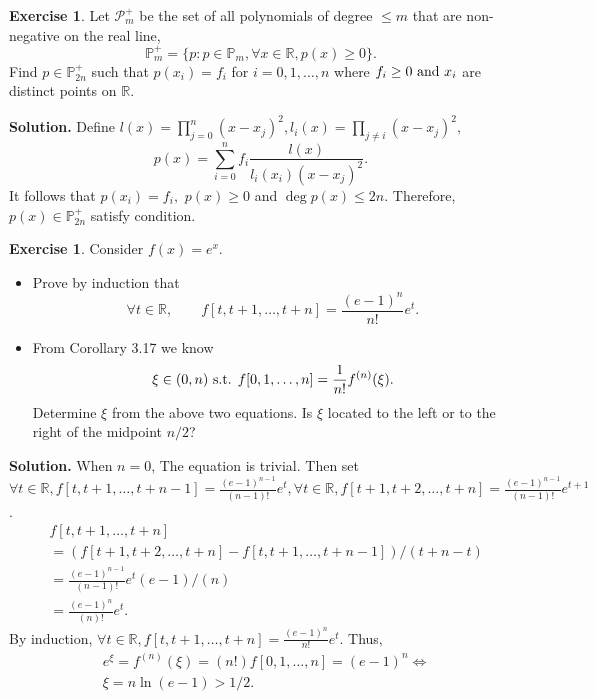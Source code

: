 \documentclass[a4paper]{book}
\newenvironment{solution}%
{\noindent\textbf{Solution.}}%
{\qedhere}
\numberwithin{equation}{chapter}
\theoremstyle{definition}
\newtheorem{exc}[exm]{Exercise}
\begin{document}
\begin{exc}
  Let $\mathcal{P}^+_m$ be the set of all polynomials of degree $\leq m$ that are non-negative on the real line,
  \begin{equation}
    \label{eq:2:2:1}
    \mathbb{P}^+_m = \{ p : p \in \mathbb{P}_m, \forall x \in \mathbb{R}, p(x) \geq 0 \}.
  \end{equation}
  Find $p \in \mathbb{P}^+_{2n}$ such that $p(x_i) = f_i$ for $i = 0,1,\dots,n $ where $f_i \geq 0 \textmd{ and } x_i $ are distinct points on $\mathbb{R}$.
\end{exc}

\begin{solution}
  Define $l(x) = \prod^n_{j = 0}(x - x_j)^2, l_i(x) = \prod_{j \neq i}(x - x_j)^2, $
  \[ p(x) = \sum^n_{i = 0} f_i\frac{l(x)}{l_i(x_i)(x - x_j)^2}. \]
  It follows that $p(x_i) = f_i, $ $p(x) \geq 0$ and $\deg p(x) \leq 2n$. Therefore, $p(x) \in \mathbb{P}^+_{2n}$ satisfy condition.
\end{solution}

\begin{exc}
  Consider $f(x) = e^x$.
  \begin{itemize}
  \item Prove by induction that
    \[ \forall t \in \mathbb{R}, \qquad f[t,t+1,\dots, t+n] = \frac{(e-1)^n}{n!}e^t .\]
  \item From Corollary 3.17 we know
    \[ \xi \in (0,n) \textmd{ s.t. } f[0,1,\dots, n] = \frac{1}{n!}f^{(n)}(\xi) .\]
    Determine $\xi$ from the above two equations. Is $\xi$ located to the left or to the right of the midpoint $n/2$?
  \end{itemize}
\end{exc}

\begin{solution}
  When $n = 0$, The equation is trivial. Then set $\forall t \in \mathbb{R}, f[t,t+1,\dots, t+n-1] = \frac{(e-1)^{n-1}}{(n-1)!}e^t, \forall t \in \mathbb{R},f[t+1,t+2,\dots, t+n] = \frac{(e-1)^{n-1}}{(n-1)!}e^{t+1}$.
  \begin{align*}
    &f[t,t+1,\dots, t+n] \\
    &=(f[t+1,t+2,\dots, t+n] - f[t,t+1,\dots, t+n-1])/(t+n - t) \\
    &=\frac{(e-1)^{n-1}}{(n-1)!}e^t(e - 1)/(n) \\
    &=\frac{(e-1)^{n}}{(n)!}e^t.
  \end{align*}
  By induction, $ \forall t \in \mathbb{R}, f[t,t+1,\dots, t+n] = \frac{(e-1)^n}{n!}e^t $.
  Thus,
  \begin{align*}
    &e^{\xi} = f^{(n)}(\xi) = (n!)f[0,1,\dots,n] = (e-1)^n \Longleftrightarrow \\
    &\xi = n \ln(e-1) > 1/2.
  \end{align*}
\end{solution}
\end{document}
